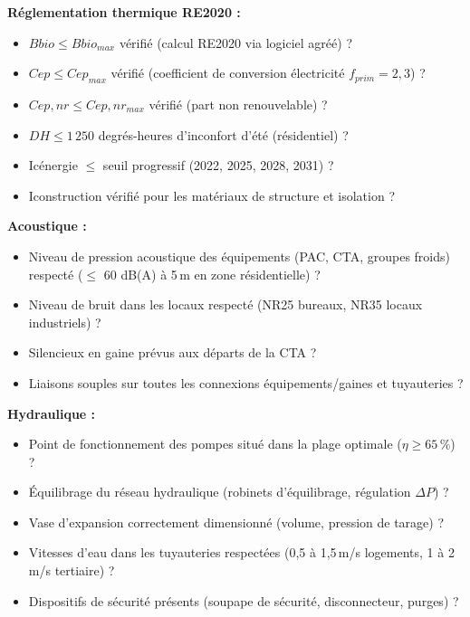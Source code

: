 \begin{methode}[title={Check-list de vérification — Note de calcul CVC}]
\textbf{Réglementation thermique RE2020 :}
\begin{itemize}
  \item[$\square$] $Bbio \leq Bbio_{max}$ vérifié (calcul RE2020 via logiciel agréé) ?
  \item[$\square$] $Cep \leq Cep_{max}$ vérifié (coefficient de conversion électricité $f_{prim} = 2{,}3$) ?
  \item[$\square$] $Cep,nr \leq Cep,nr_{max}$ vérifié (part non renouvelable) ?
  \item[$\square$] $DH \leq 1\,250$ degrés-heures d'inconfort d'été (résidentiel) ?
  \item[$\square$] Icénergie $\leq$ seuil progressif (2022, 2025, 2028, 2031) ?
  \item[$\square$] Iconstruction vérifié pour les matériaux de structure et isolation ?
\end{itemize}

\textbf{Acoustique :}
\begin{itemize}
  \item[$\square$] Niveau de pression acoustique des équipements (PAC, CTA, groupes froids) respecté ($\leq$ 60 dB(A) à 5\,m en zone résidentielle) ?
  \item[$\square$] Niveau de bruit dans les locaux respecté (NR25 bureaux, NR35 locaux industriels) ?
  \item[$\square$] Silencieux en gaine prévus aux départs de la CTA ?
  \item[$\square$] Liaisons souples sur toutes les connexions équipements/gaines et tuyauteries ?
\end{itemize}

\textbf{Hydraulique :}
\begin{itemize}
  \item[$\square$] Point de fonctionnement des pompes situé dans la plage optimale ($\eta \geq 65\,\%$) ?
  \item[$\square$] Équilibrage du réseau hydraulique (robinets d'équilibrage, régulation $\Delta P$) ?
  \item[$\square$] Vase d'expansion correctement dimensionné (volume, pression de tarage) ?
  \item[$\square$] Vitesses d'eau dans les tuyauteries respectées (0,5 à 1,5\,m/s logements, 1 à 2\,m/s tertiaire) ?
  \item[$\square$] Dispositifs de sécurité présents (soupape de sécurité, disconnecteur, purges) ?
\end{itemize}


\end{methode}
